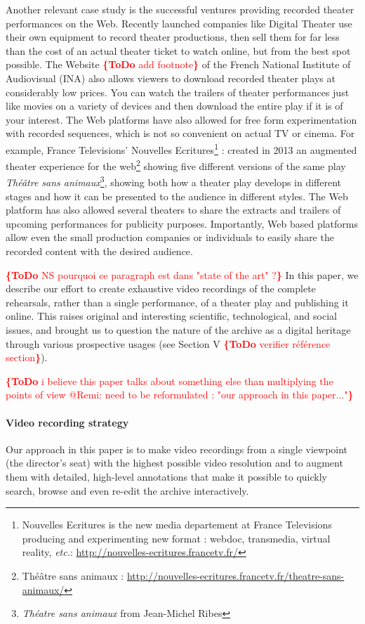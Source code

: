 \documentclass[conference]{IEEEtran}
\newcommand{\todo}[1]{\noindent\textcolor{red}{{\bf \{ToDo} #1{\bf \}}}}
\begin{document}
Another relevant case study  is the successful ventures providing recorded
theater performances on the Web. Recently launched companies like Digital Theater use their
own equipment to record theater productions, then sell them for far less than the cost of an
actual theater ticket to watch online, but from the best spot possible. The Website \todo{add footnote} of the French
National Institute of Audiovisual (INA) also allows viewers to download recorded theater plays
at considerably low prices. You can watch the trailers of theater performances just like movies
on a variety of devices and then download the entire play if it is of your interest. The Web platforms
have also allowed for free form experimentation with recorded sequences, which is not
so convenient on actual TV or cinema. For example, France Televisions' Nouvelles Ecritures\footnote{Nouvelles Ecritures is the new media departement at France Televisions producing and experimenting new format : webdoc, transmedia, virtual reality, \emph{etc.}: \url{http://nouvelles-ecritures.francetv.fr/}} :  created in 2013 an augmented theater experience for the web\footnote{Théâtre sans animaux : \url{http://nouvelles-ecritures.francetv.fr/theatre-sans-animaux/}} showing five different versions of the same play \emph{Théâtre sans animaux}\footnote{\emph{Théatre sans animaux} from Jean-Michel Ribes}, showing both how a theater play develops in different stages and how it can be presented to the audience in different styles. The Web platform has also allowed several theaters to share the extracts and trailers of upcoming performances for publicity purposes. Importantly, Web based platforms allow even the small production companies or individuals to easily share the recorded content with the desired audience.

\todo{NS pourquoi ce paragraph est dans "state of the art" ?}
In this paper, we describe our effort to create exhaustive video recordings of the complete rehearsals, rather than a single performance, of a theater play and publishing it online. This raises original and interesting scientific, technological, and social issues, and brought us to question the nature of the archive as a digital heritage through various prospective usages (see Section V \todo{verifier référence section}). 

\todo{i believe this paper talks about something else than multiplying the points of view @Remi: need to be reformulated : "our approach in this paper..."}
\paragraph*{Video recording strategy}
Our approach in this paper is to make video recordings from a single viewpoint (the director's seat) with the highest possible video resolution and to augment them with detailed, high-level  annotations that make it possible to quickly  search, browse and even re-edit the archive interactively. 
\end{document}
